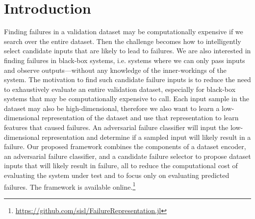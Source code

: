 



\section{Introduction}
Finding failures in a validation dataset may be computationally expensive if we search over the entire dataset.
Then the challenge becomes how to intelligently select candidate inputs that are likely to lead to failures.
We are also interested in finding failures in black-box systems, i.e. systems where we can only pass inputs and observe outputs---without any knowledge of the inner-workings of the system.
The motivation to find such candidate failure inputs is to reduce the need to exhaustively evaluate an entire validation dataset, especially for black-box systems that may be computationally expensive to call.
Each input sample in the dataset may also be high-dimensional, therefore we also want to learn a low-dimensional representation of the dataset and use that representation to learn features that caused failures.
An adversarial failure classifier will input the low-dimensional representation and determine if a sampled input will likely result in a failure.
Our proposed framework combines the components of a dataset encoder, an adversarial failure classifier, and a candidate failure selector to propose dataset inputs that will likely result in failure, all to reduce the computational cost of evaluating the system under test and to focus only on evaluating predicted failures.
The framework is available online.\footnote{\url{https://github.com/sisl/FailureRepresentation.jl}}

